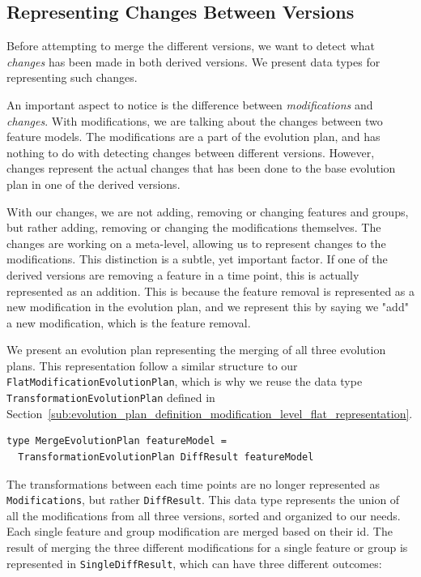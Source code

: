 \documentclass[a4paper,english]{ifimaster}
\begin{document}
\subsection{Representing Changes Between Versions}%
\label{sub:representing_changes_between_versions}

Before attempting to merge the different versions, we want to detect what \textit{changes} has been made in both derived versions. We present data types for representing such changes.

An important aspect to notice is the difference between \textit{modifications} and \textit{changes}. With modifications, we are talking about the changes between two feature models. The modifications are a part of the evolution plan, and has nothing to do with detecting changes between different versions. However, changes represent the actual changes that has been done to the base evolution plan in one of the derived versions.

With our changes, we are not adding, removing or changing features and groups, but rather adding, removing or changing the modifications themselves. The changes are working on a meta-level, allowing us to represent changes to the modifications. This distinction is a subtle, yet important factor. If one of the derived versions are removing a feature in a time point, this is actually represented as an addition. This is because the feature removal is represented as a new modification in the evolution plan, and we represent this by saying we "add" a new modification, which is the feature removal.

We present an evolution plan representing the merging of all three evolution plans. This representation follow a similar structure to our \texttt{FlatModificationEvolutionPlan}, which is why we reuse the data type \texttt{TransformationEvolutionPlan} defined in Section~\vref{sub:evolution_plan_definition_modification_level_flat_representation}.

\begin{verbatim}
type MergeEvolutionPlan featureModel = 
  TransformationEvolutionPlan DiffResult featureModel
\end{verbatim}

The transformations between each time points are no longer represented as \texttt{Modifications}, but rather \texttt{DiffResult}. This data type represents the union of all the modifications from all three versions, sorted and organized to our needs. Each single feature and group modification are merged based on their id. The result of merging the three different modifications for a single feature or group is represented in \texttt{SingleDiffResult}, which can have three different outcomes:
\end{document}
